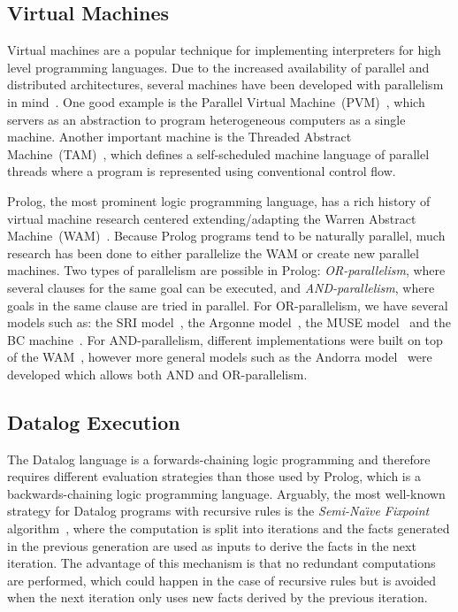 \subsection{Virtual Machines}

Virtual machines are a popular technique for implementing interpreters for high
level programming languages. Due to the increased availability of parallel
and distributed architectures, several machines have been developed with
parallelism in mind~\cite{Kara:1997:AMM:265274}. One good example is
the Parallel Virtual Machine~(PVM)~\cite{Sunderam90pvm:a}, which servers as an
abstraction to program heterogeneous computers as a single machine. Another
important machine is the Threaded Abstract
Machine~(TAM)~\cite{CullerGSvE93,goldstein-tr94}, which defines a self-scheduled
machine language of parallel threads where a program is represented using
conventional control flow.

Prolog, the most prominent logic programming language, has a rich history of
virtual machine research centered extending/adapting the Warren Abstract
Machine~(WAM)~\cite{AICPub641:1983}.  Because Prolog programs tend to be
naturally parallel, much research has been done to either parallelize the WAM or
create new parallel machines. Two types of parallelism are possible in Prolog:
\emph{OR-parallelism}, where several clauses for the same goal can be executed,
and \emph{AND-parallelism}, where goals in the same clause are tried in
parallel. For OR-parallelism, we have several models such as: the SRI
model~\cite{Warren:1987:OEM:67683.67699}, the Argonne
model~\cite{ButlerDLOOS88}, the MUSE model~\cite{Ali:1990fk} and the BC
machine~\cite{Ali88}. For AND-parallelism, different implementations were built
on top of the WAM~\cite{Hermenegildo:1986:AMB:913061,Lin:1988:AEL:900478},
however more general models such as the Andorra
model~\cite{Haridi:1990:KAP:87961.87964} were developed which allows both AND
and OR-parallelism.

\subsection{Datalog Execution}

The Datalog language is a forwards-chaining logic
programming and therefore requires different evaluation strategies than those
used by Prolog, which is a backwards-chaining logic programming language.
Arguably, the most well-known strategy for Datalog programs with recursive rules
is the \emph{Semi-Na\"{\i}ve Fixpoint}
algorithm~\cite{Balbin:1987:GDA:34657.34661}, where the computation is split
into iterations and the facts generated in the previous generation are used as
inputs to derive the facts in the next iteration. The advantage of this
mechanism is that no redundant computations are performed, which could happen in
the case of recursive rules but is avoided when the next iteration only uses new
facts derived by the previous iteration.
   
